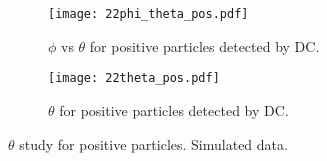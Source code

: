     \begin{figure}
        \centering
        \begin{subfigure}[b]{\textwidth}
            \centering
            \texttt{[image: 22phi\_theta\_pos.pdf]}
            \caption[$\phi$ vs $\theta$ for positive particles]
            {$\phi$ vs $\theta$ for positive particles detected by DC.}
            \label{fig::14.22::phi_theta_pos}
        \end{subfigure}
        \begin{subfigure}[b]{\textwidth}
            \centering
            \texttt{[image: 22theta\_pos.pdf]}
            \caption[$\theta$ for positive particles]
            {$\theta$ for positive particles detected by DC.}
            \label{fig::14.22::theta_pos}
        \end{subfigure}
        \caption[$\theta$ study for positive particles]
        {$\theta$ study for positive particles.
        Simulated data.}
        \label{fig::14.22::theta_study_pos}
    \end{figure}

    \pagebreak
